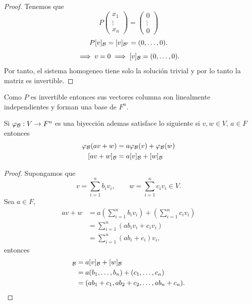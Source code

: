 \documentclass[12pt,a4paper]{book}
\newcommand{\parentesis}[1]{\left(#1\right)}
\begin{document}
    \begin{proof}
    Tenemos que
        \begin{equation*}
            P
            \begin{pmatrix}
                x_{1}\\
                \vdots\\
                x_{n}
            \end{pmatrix}
            =
            \begin{pmatrix}
                0\\
                \vdots\\
                0
            \end{pmatrix}
        \end{equation*}
        \begin{equation*}
            P[v]_{\mathcal{B}}=[v]_{\mathcal{B}^{\prime}}=(0,\dots,0).
        \end{equation*}
        \begin{equation*}
            \implies v=0\implies [v]_{\mathcal{B}}=(0,\dots,0).
        \end{equation*}
        Por tanto, el sistema homogeneo tiene solo la solución trivial y por lo tanto
        la matriz es invertible.
    \end{proof}

    Como $P$ es invertible entonces sus vectores columna son linealmente independientes y forman
    una base de $F^{n}$.
    
    \begin{proposicion}
        Si $\varphi_{\mathcal{B}}:V\to F^{n}$ es una biyección ademas satisface lo siguiente si $v,w\in V$,
        $a\in F$ entonces
        \begin{align*}
            \varphi_{\mathcal{B}}(av+w)&=a\varphi_{\mathcal{B}}(v)+\varphi_{\mathcal{B}}(w)\\
            [av+w]_{\mathcal{B}}&=a[v]_{\mathcal{B}}+[w]_{\mathcal{B}}
        \end{align*}
    \end{proposicion}

    \begin{proof}
        Supongamos que
        \begin{equation*}
            v=\sum_{i=1}^{n}b_{i}v_{i},\qquad w=\sum_{i=1}^{n}c_{i}v_{i}\in V.
        \end{equation*}
        Sea $a\in F$,
        \begin{align*}
            av+w&=a\parentesis{\sum_{i=1}^{n}b_{i}v_{i}}+\parentesis{\sum_{i=1}^{n}c_{i}v_{i}}\\
            &=\sum_{i=1}^{n}(ab_{i}v_{i}+c_{i}v_{i})\\
            &=\sum_{i=1}^{n}(ab_{i}+c_{i})v_{i},
        \end{align*}
        entonces
        \begin{align*}
            [av+w]_{\BB}&=a[v]_{\BB}+[w]_{\BB}\\
            &=a(b_{1},\dots,b_{n})+(c_{1},\dots,c_{n})\\
            &=(ab_{1}+c_{1},ab_{2}+c_{2},\dots,ab_{n}+c_{n}).
        \end{align*}
    \end{proof}
\end{document}

